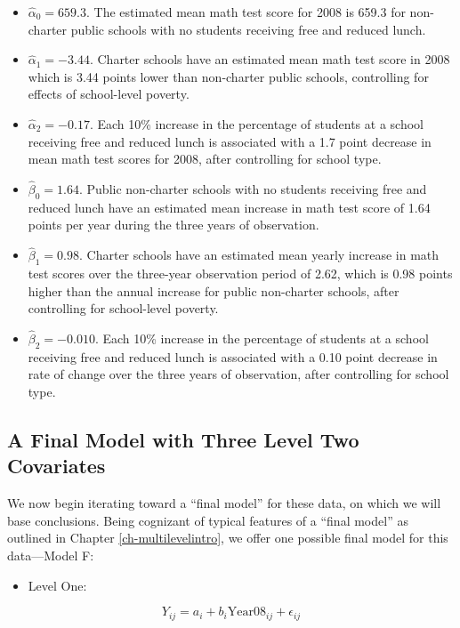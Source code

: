 \documentclass[
]{krantz}
\providecommand{\tightlist}{%
  \setlength{\itemsep}{0pt}\setlength{\parskip}{0pt}}
\begin{document}
\begin{itemize}
\item
  \(\hat{\alpha}_{0}= 659.3.\) The estimated mean math test score for 2008 is 659.3 for non-charter public schools with no students receiving free and reduced lunch.
\item
  \(\hat{\alpha}_{1}= -3.44.\) Charter schools have an estimated mean math test score in 2008 which is 3.44 points lower than non-charter public schools, controlling for effects of school-level poverty.
\item
  \(\hat{\alpha}_{2}= -0.17.\) Each 10\% increase in the percentage of students at a school receiving free and reduced lunch is associated with a 1.7 point decrease in mean math test scores for 2008, after controlling for school type.
\item
  \(\hat{\beta}_{0}= 1.64.\) Public non-charter schools with no students receiving free and reduced lunch have an estimated mean increase in math test score of 1.64 points per year during the three years of observation.
\item
  \(\hat{\beta}_{1}= 0.98.\) Charter schools have an estimated mean yearly increase in math test scores over the three-year observation period of 2.62, which is 0.98 points higher than the annual increase for public non-charter schools, after controlling for school-level poverty.
\item
  \(\hat{\beta}_{2}= -0.010.\) Each 10\% increase in the percentage of students at a school receiving free and reduced lunch is associated with a 0.10 point decrease in rate of change over the three years of observation, after controlling for school type.
\end{itemize}

\subsection{A Final Model with Three Level Two Covariates}\label{modelf9}

We now begin iterating toward a ``final model'' for these data, on which we will base conclusions. Being cognizant of typical features of a ``final model'' as outlined in Chapter \ref{ch-multilevelintro}, we offer one possible final model for this data---Model F:

\begin{itemize}
\tightlist
\item
  Level One:
\end{itemize}

\begin{equation*}
Y_{ij}= a_{i} + b_{i}\textrm{Year08}_{ij} + \epsilon_{ij}
\end{equation*}
\end{document}
